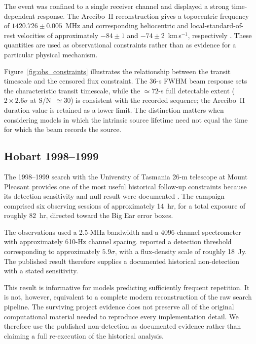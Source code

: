 \documentclass[twocolumn]{aastex701}
\begin{document}
The event was confined to a single receiver channel and displayed a strong time-dependent response. The Arecibo~II reconstruction gives a topocentric frequency of $1420.726\pm0.005$~MHz and corresponding heliocentric and local-standard-of-rest velocities of approximately $-84\pm1$ and $-74\pm2$~km\,s$^{-1}$, respectively \citep{mendez2025}. These quantities are used as observational constraints rather than as evidence for a particular physical mechanism.

Figure~\ref{fig:obs_constraints} illustrates the relationship between the transit timescale and the censored flux constraint. The 36-s FWHM beam response sets the characteristic transit timescale, while the $\simeq72$-s full detectable extent ($2\times2.6\sigma$ at S/N~$\simeq30$) is consistent with the recorded sequence; the Arecibo~II duration value is retained as a lower limit. The distinction matters when considering models in which the intrinsic source lifetime need not equal the time for which the beam records the source.

\subsection{Hobart 1998--1999}

The 1998--1999 search with the University of Tasmania 26-m telescope at Mount Pleasant provides one of the most useful historical follow-up constraints because its detection sensitivity and null result were documented \citep{gray2002}. The campaign comprised six observing sessions of approximately 14~hr, for a total exposure of roughly 82~hr, directed toward the Big Ear error boxes.

The observations used a 2.5-MHz bandwidth and a 4096-channel spectrometer with approximately 610-Hz channel spacing. \citet{gray2002} reported a detection threshold corresponding to approximately $5.9\sigma$, with a flux-density scale of roughly 18~Jy. The published result therefore supplies a documented historical non-detection with a stated sensitivity.

This result is informative for models predicting sufficiently frequent repetition. It is not, however, equivalent to a complete modern reconstruction of the raw search pipeline. The surviving project evidence does not preserve all of the original computational material needed to reproduce every implementation detail. We therefore use the published non-detection as documented evidence rather than claiming a full re-execution of the historical analysis.
\end{document}
